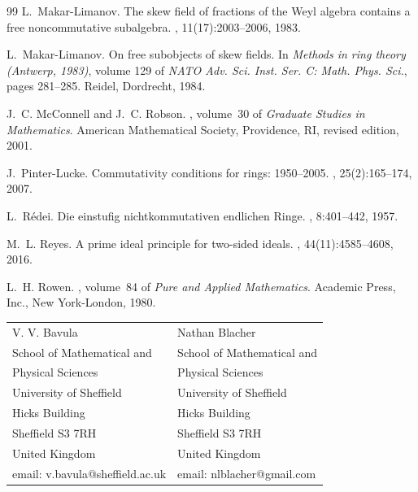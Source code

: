 \documentclass[11pt]{article}
\theoremstyle{definition}
\begin{document}
\begin{thebibliography}{99}
L.~Makar-Limanov.
\newblock The skew field of fractions of the {W}eyl algebra contains a free
  noncommutative subalgebra.
, 11(17):2003--2006, 1983.

L.~Makar-Limanov.
\newblock On free subobjects of skew fields.
\newblock In {\em Methods in ring theory ({A}ntwerp, 1983)}, volume 129 of {\em
  NATO Adv. Sci. Inst. Ser. C: Math. Phys. Sci.}, pages 281--285. Reidel,
  Dordrecht, 1984.

J.~C. McConnell and J.~C. Robson.
, volume~30 of {\em Graduate
  Studies in Mathematics}.
\newblock American Mathematical Society, Providence, RI, revised edition, 2001.

J.~Pinter-Lucke.
\newblock Commutativity conditions for rings: 1950--2005.
, 25(2):165--174, 2007.

L.~R\'edei.
\newblock Die einstufig nichtkommutativen endlichen {R}inge.
, 8:401--442, 1957.

M.~L. Reyes.
\newblock A prime ideal principle for two-sided ideals.
, 44(11):4585--4608, 2016.

L.~H. Rowen.
, volume~84 of {\em Pure
  and Applied Mathematics}.
\newblock Academic Press, Inc., New York-London, 1980.

\end{thebibliography}

\begin{tabular}{l  l}
V. V. Bavula & \quad \quad\quad \quad \quad \quad Nathan Blacher \\ 
School of Mathematical and & \quad \quad\quad \quad\quad \quad School of Mathematical and\\
Physical Sciences &\quad \quad\quad \quad\quad \quad Physical Sciences\\
University of Sheffield & \quad \quad\quad \quad\quad \quad University of Sheffield\\
Hicks Building & \quad \quad\quad \quad\quad \quad Hicks Building\\
Sheffield S3 7RH & \quad \quad\quad \quad\quad \quad Sheffield S3 7RH\\
United Kingdom & \quad \quad\quad \quad\quad \quad United Kingdom\\
email: v.bavula@sheffield.ac.uk & \quad \quad\quad \quad\quad \quad email: nlblacher@gmail.com\\
\end{tabular}
\end{document}

